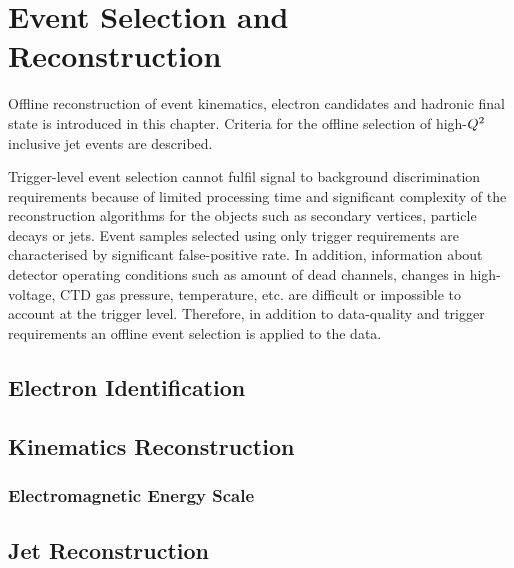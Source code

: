 \chapter{Event Selection and Reconstruction}
Offline reconstruction of event kinematics, electron candidates and hadronic final state is introduced in this chapter. Criteria for the offline selection of high-$\mbox{${Q^2}$}$ inclusive jet events are described. 

Trigger-level event selection cannot fulfil signal to background discrimination requirements because of limited processing time and significant complexity of the reconstruction algorithms for the objects such as secondary vertices, particle decays or jets. Event samples selected using only trigger requirements are characterised by significant false-positive rate. In addition, information about detector operating conditions such as amount of dead channels, changes in high-voltage, CTD gas pressure, temperature, etc. are difficult or impossible to account at the trigger level. Therefore, in addition to data-quality and trigger requirements an offline event selection is applied to the data.

\section{Electron Identification}
\label{sec:eleid}


\section{Kinematics Reconstruction}
\label{sec:kinrec}


\subsection{Electromagnetic Energy Scale}
\label{subsec:eleenescale}


\section{Jet Reconstruction}
\label{sec:jetreco}


